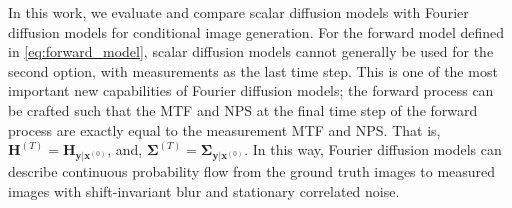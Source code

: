 \documentclass[12pt,]{article}
\begin{document}
In this work, we evaluate and compare scalar diffusion models with Fourier diffusion models for conditional image generation.  For the forward model defined in \eqref{eq:forward_model}, scalar diffusion models cannot generally be used for the second option, with measurements as the last time step. This is one of the most important new capabilities of Fourier diffusion models; the forward process can be crafted such that the MTF and NPS at the final time step of the forward process are exactly equal to the measurement MTF and NPS. That is, $\mathbf{H}^{(T)} = \mathbf{H}_{\mathbf{y}|\mathbf{x}^{(0)}}$, and, $\boldsymbol{\Sigma}^{(T)}=\boldsymbol{\Sigma}_{\mathbf{y}|\mathbf{x}^{(0)}}$. In this way, Fourier diffusion models can describe continuous probability flow from the ground truth images to measured images with shift-invariant blur and stationary correlated noise. 



\end{document}
